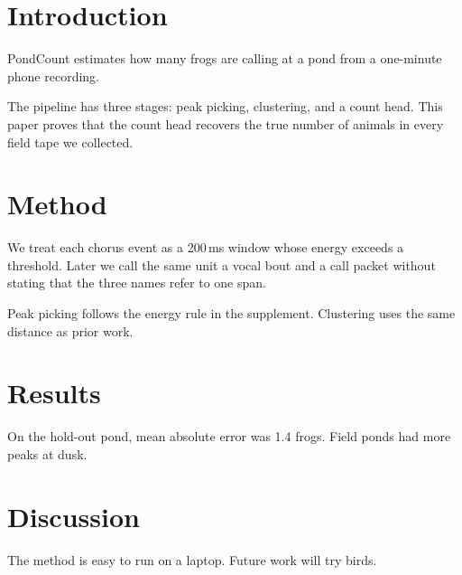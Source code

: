 \documentclass{article}
\begin{document}
\section{Introduction}

PondCount estimates how many frogs are calling at a pond from a one-minute phone recording.

The pipeline has three stages: peak picking, clustering, and a count head. This paper proves that the count head recovers the true number of animals in every field tape we collected.

\section{Method}

We treat each chorus event as a 200\,ms window whose energy exceeds a threshold. Later we call the same unit a vocal bout and a call packet without stating that the three names refer to one span.

Peak picking follows the energy rule in the supplement. Clustering uses the same distance as prior work.

\section{Results}

On the hold-out pond, mean absolute error was 1.4 frogs. Field ponds had more peaks at dusk.

\section{Discussion}

The method is easy to run on a laptop. Future work will try birds.
\end{document}
